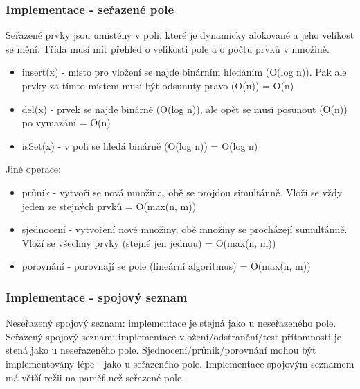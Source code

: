 \documentclass{szzclass}
\begin{document}
\subsubsection{Implementace - seřazené pole}
Seřazené prvky jsou umístěny v poli, které je dynamicky alokované a jeho velikost se mění. Třída musí mít přehled o velikosti pole
a o počtu prvků v množině.
\begin{itemize}
    \item insert(x) - místo pro vložení se najde binárním hledáním (O(log n)). Pak ale prvky za tímto místem musí být odsunuty pravo (O(n)) = O(n)
    \item del(x) - prvek se najde binárně (O(log n)), ale opět se musí posunout (O(n)) po vymazání = O(n)
    \item isSet(x) - v poli se hledá binárně (O(log n)) = O(log n)
\end{itemize}
Jiné operace:
\begin{itemize}
    \item průnik - vytvoří se nová množina, obě se projdou simultánně. Vloží se vždy jeden ze stejných prvků = O(max(n, m))
    \item sjednocení - vytvoření nové množiny, obě množiny se procházejí sumultánně. Vloží se všechny prvky (stejné jen jednou) = O(max(n, m))
    \item porovnání - porovnají se pole (lineární algoritmus) = O(max(n, m))
\end{itemize}
\subsubsection{Implementace - spojový seznam}
Neseřazený spojový seznam: implementace je stejná jako u neseřazeného pole.\newline
Seřazený spojový seznam: implementace vložení/odstranění/test přítomnosti je stená jako u neseřazeného pole. Sjednocení/průnik/porovnání mohou být
implementovány lépe - jako u seřazeného pole.\newline
Implementace spojovým seznamem má větší režii na paměť než seřazené pole.
\end{document}
